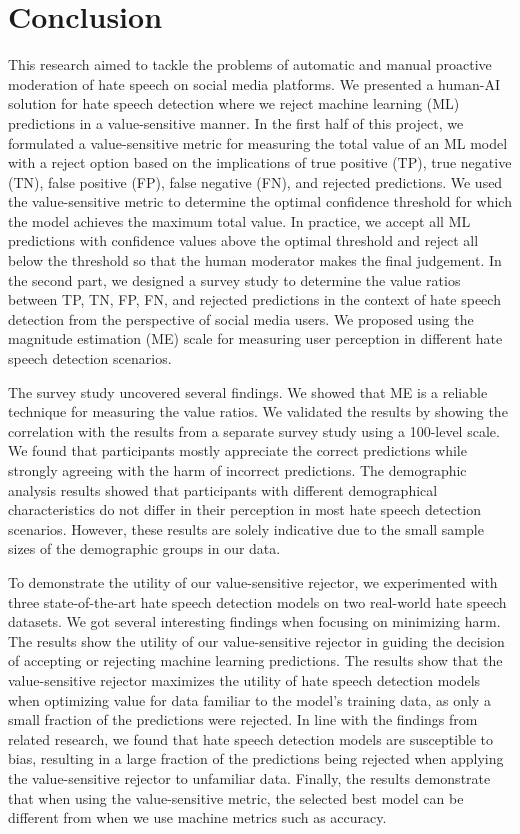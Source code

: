 \chapter{Conclusion}
\label{ch:conclusion}
This research aimed to tackle the problems of automatic and manual proactive moderation of hate speech on social media platforms.
%
We presented a human-AI solution for hate speech detection where we reject machine learning (ML) predictions in a value-sensitive manner.
%
In the first half of this project, we formulated a value-sensitive metric for measuring the total value of an ML model with a reject option based on the implications of true positive (TP), true negative (TN), false positive (FP), false negative (FN), and rejected predictions.
%
We used the value-sensitive metric to determine the optimal confidence threshold for which the model achieves the maximum total value.
%
In practice, we accept all ML predictions with confidence values above the optimal threshold and reject all below the threshold so that the human moderator makes the final judgement.
%
In the second part, we designed a survey study to determine the value ratios between TP, TN, FP, FN, and rejected predictions in the context of hate speech detection from the perspective of social media users.
%
We proposed using the magnitude estimation (ME) scale for measuring user perception in different hate speech detection scenarios.
%

%
The survey study uncovered several findings.
%
We showed that ME is a reliable technique for measuring the value ratios.
%
We validated the results by showing the correlation with the results from a separate survey study using a 100-level scale.
%
We found that participants mostly appreciate the correct predictions while strongly agreeing with the harm of incorrect predictions.
%
The demographic analysis results showed that participants with different demographical characteristics do not differ in their perception in most hate speech detection scenarios.
%
However, these results are solely indicative due to the small sample sizes of the demographic groups in our data.
%

%
To demonstrate the utility of our value-sensitive rejector, we experimented with three state-of-the-art hate speech detection models on two real-world hate speech datasets.
%
We got several interesting findings when focusing on minimizing harm.
%
The results show the utility of our value-sensitive rejector in guiding the decision of accepting or rejecting machine learning predictions.
%
The results show that the value-sensitive rejector maximizes the utility of hate speech detection models when optimizing value for data familiar to the model's training data, as only a small fraction of the predictions were rejected.
%
In line with the findings from related research, we found that hate speech detection models are susceptible to bias, resulting in a large fraction of the predictions being rejected when applying the value-sensitive rejector to unfamiliar data.
%
Finally, the results demonstrate that when using the value-sensitive metric, the selected best model can be different from when we use machine metrics such as accuracy.
%
